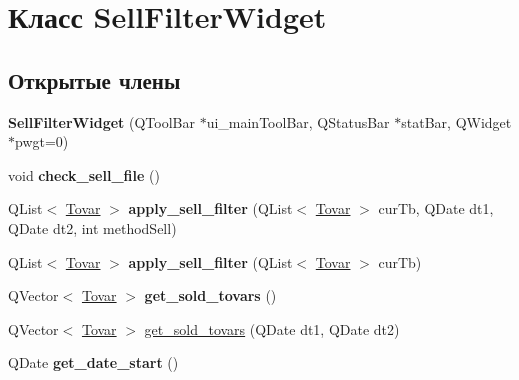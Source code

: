 \hypertarget{class_sell_filter_widget}{\section{Класс \-Sell\-Filter\-Widget}
\label{class_sell_filter_widget}
}
\subsection*{Открытые члены}
\begin{DoxyCompactItemize}
\item 
\hypertarget{class_sell_filter_widget_ab149a8c15edfbe23b189b1b07e29a996}{{\bfseries \-Sell\-Filter\-Widget} (\-Q\-Tool\-Bar $\ast$ui\-\_\-main\-Tool\-Bar, \-Q\-Status\-Bar $\ast$stat\-Bar, \-Q\-Widget $\ast$pwgt=0)}\label{class_sell_filter_widget_ab149a8c15edfbe23b189b1b07e29a996}

\item 
\hypertarget{class_sell_filter_widget_a1098fdc1b005b7ae6c34b169b6285628}{void {\bfseries check\-\_\-sell\-\_\-file} ()}\label{class_sell_filter_widget_a1098fdc1b005b7ae6c34b169b6285628}

\item 
\hypertarget{class_sell_filter_widget_a7c6005c4bd9f9f3fec09df5447876188}{\-Q\-List$<$ \hyperlink{struct_tovar}{\-Tovar} $>$ {\bfseries apply\-\_\-sell\-\_\-filter} (\-Q\-List$<$ \hyperlink{struct_tovar}{\-Tovar} $>$ cur\-Tb, \-Q\-Date dt1, \-Q\-Date dt2, int method\-Sell)}\label{class_sell_filter_widget_a7c6005c4bd9f9f3fec09df5447876188}

\item 
\hypertarget{class_sell_filter_widget_a3a70cd8b7bbc0665db0c0bc74e556adb}{\-Q\-List$<$ \hyperlink{struct_tovar}{\-Tovar} $>$ {\bfseries apply\-\_\-sell\-\_\-filter} (\-Q\-List$<$ \hyperlink{struct_tovar}{\-Tovar} $>$ cur\-Tb)}\label{class_sell_filter_widget_a3a70cd8b7bbc0665db0c0bc74e556adb}

\item 
\hypertarget{class_sell_filter_widget_ad4cb4e729168f060eb02b483e0500b20}{\-Q\-Vector$<$ \hyperlink{struct_tovar}{\-Tovar} $>$ {\bfseries get\-\_\-sold\-\_\-tovars} ()}\label{class_sell_filter_widget_ad4cb4e729168f060eb02b483e0500b20}

\item 
\-Q\-Vector$<$ \hyperlink{struct_tovar}{\-Tovar} $>$ \hyperlink{class_sell_filter_widget_a4c3b63cb7a8468d3e3c3a0dce22c7459}{get\-\_\-sold\-\_\-tovars} (\-Q\-Date dt1, \-Q\-Date dt2)
\item 
\hypertarget{class_sell_filter_widget_a0e2e7dee068d5701c22f466a4e4ac34d}{\-Q\-Date {\bfseries get\-\_\-date\-\_\-start} ()}\label{class_sell_filter_widget_a0e2e7dee068d5701c22f466a4e4ac34d}


\end{DoxyCompactItemize}
